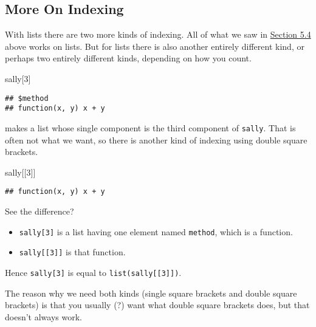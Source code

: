 \documentclass[
]{article}
\newenvironment{Shaded}{\begin{snugshade}}{\end{snugshade}}
\newcommand{\DecValTok}[1]{\textcolor[rgb]{0.00,0.00,0.81}{#1}}
\newcommand{\NormalTok}[1]{#1}
\providecommand{\tightlist}{%
  \setlength{\itemsep}{0pt}\setlength{\parskip}{0pt}}
\begin{document}
\hypertarget{more-on-indexing}{%
\subsection{More On Indexing}\label{more-on-indexing}}

With lists there are two more kinds of indexing. All of what we saw in
\protect\hyperlink{indexing}{Section 5.4} above works on lists. But for
lists there is also another entirely different kind, or perhaps two
entirely different kinds, depending on how you count.

\begin{Shaded}
\begin{Highlighting}[]
\NormalTok{sally[}\DecValTok{3}\NormalTok{]}
\end{Highlighting}
\end{Shaded}

\begin{verbatim}
## $method
## function(x, y) x + y
\end{verbatim}

makes a list whose single component is the third component of
\texttt{sally}. That is often not what we want, so there is another kind
of indexing using double square brackets.

\begin{Shaded}
\begin{Highlighting}[]
\NormalTok{sally[[}\DecValTok{3}\NormalTok{]]}
\end{Highlighting}
\end{Shaded}

\begin{verbatim}
## function(x, y) x + y
\end{verbatim}

See the difference?

\begin{itemize}
\tightlist
\item
  \texttt{sally{[}3{]}} is a list having one element named
  \texttt{method}, which is a function.
\item
  \texttt{sally{[}{[}3{]}{]}} is that function.
\end{itemize}

Hence \texttt{sally{[}3{]}} is equal to
\texttt{list(sally{[}{[}3{]}{]})}.

The reason why we need both kinds (single square brackets and double
square brackets) is that you usually (?) want what double square
brackets does, but that doesn't always work.
\end{document}
